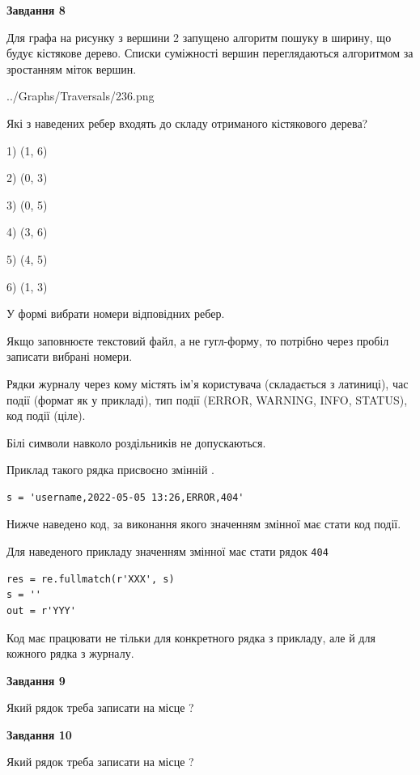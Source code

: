 \documentclass[12pt, ukrainian]{article}
\def\code#1{\Verb!#1!}
\begin{document}
{\begin {large}
{\begin {center}\textbf{Завдання 8}\end {center}}\par
Для графа на рисунку з вершини 2 запущено алгоритм пошуку в ширину, що будує кістякове дерево. Списки суміжності вершин переглядаються алгоритмом за зростанням міток вершин.\par
\begin{center}
	{../Graphs/Traversals/236.png}
\end{center}
\par Які з наведених ребер входять до складу отриманого кістякового дерева?\par
1) (1, 6)\par
2) (0, 3)\par
3) (0, 5)\par
4) (3, 6)\par
5) (4, 5)\par
6) (1, 3)\par
{\vskip 15pt} У формі вибрати номери відповідних ребер.


Якщо заповнюєте текстовий файл, а не гугл-форму, то потрібно через пробіл записа\-ти вибрані номери.\par
\newpage


Рядки журналу через кому містять ім'я користувача (складається з латиниці), час події (фор\-мат як у прикладі), тип події (ERROR, WARNING, INFO, STATUS), код події (ціле).

Білі символи навколо роздільників не допускаються.

Приклад такого рядка присвоєно змінній .



\begin{verbatim}
s = 'username,2022-05-05 13:26,ERROR,404'
\end{verbatim}


Нижче наведено код, за виконання якого значенням змінної  має стати код події.

Для наведеного прикладу значенням змінної  має стати рядок \code{404}



\begin{verbatim}
res = re.fullmatch(r'XXX', s)
s = ''
out = r'YYY'
\end{verbatim}


Код має працювати не тільки для конкретного рядка з прикладу, але й для кожного рядка з журналу.

{\begin {center}\textbf{Завдання 9}\end {center}}\par
Який рядок треба записати на місце  ?\par
\vspace{5mm}


{\begin {center}\textbf{Завдання 10}\end {center}}\par
Який рядок треба записати на місце  ?\par


\newpage


\end {large}}
\end{document}
